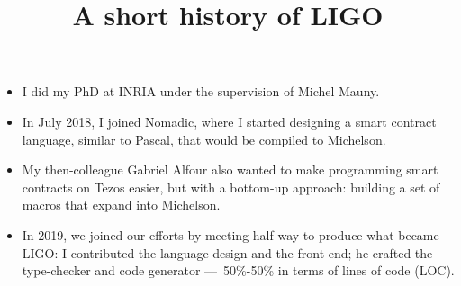 \documentclass[wide]{slides}
\newcommand{\Michelson}[0]{\textsf{Michelson}}
\begin{document}
\maketitle

\begin{slide}
  \title{A short history of LIGO}

  \begin{itemize}

    \item I did my PhD at INRIA under the supervision of Michel Mauny.

    \item In July 2018, I joined Nomadic, where I started designing a
      smart contract language, similar to \textsf{Pascal}, that would
      be compiled to \Michelson{}.

    \item My then-colleague Gabriel Alfour also wanted to make
      programming smart contracts on \textsf{Tezos} easier, but with a
      bottom\hyp{}up approach: building a set of macros that expand
      into \Michelson{}.

    \item In 2019, we joined our efforts by meeting half\hyp{}way to
      produce what became LIGO: I contributed the language design and
      the front-end; he crafted the type-checker and code generator
      ---~50\%-50\% in terms of lines of code (LOC).

  \end{itemize}
\end{slide}
\end{document}
